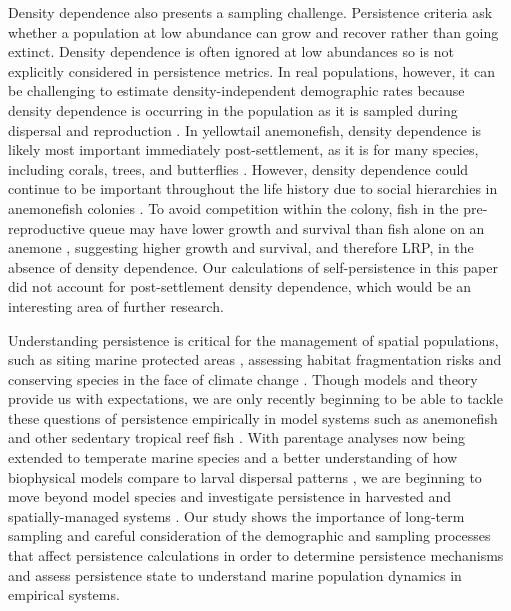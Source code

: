 \documentclass[12pt, oneside]{article}   	%
\begin{document}
Density dependence also presents a sampling challenge. Persistence criteria \citep{hastings_persistence_2006, burgess2014beyond} ask whether a population at low abundance can grow and recover rather than going extinct. Density dependence is often ignored at low abundances \citep{botsford2019population} so is not explicitly considered in persistence metrics. In real populations, however, it can be challenging to estimate density-independent demographic rates because density dependence is occurring in the population as it is sampled during dispersal \citep{nowicki2011evidence} and reproduction \citep{rodenhouse2003multiple}. In yellowtail anemonefish, density dependence is likely most important immediately post-settlement, as it is for many species, including corals, trees, and butterflies \citep{vermeij2008density, harms2000pervasive, nowicki2009relative}. However, density dependence could continue to be important throughout the life history due to social hierarchies in anemonefish colonies \citep{buston2011determinants}. To avoid competition within the colony, fish in the pre-reproductive queue may have lower growth and survival than fish alone on an anemone \citep{buston2003social, buston2003forcible}, suggesting higher growth and survival, and therefore LRP, in the absence of density dependence. Our calculations of self-persistence in this paper did not account for post-settlement density dependence, which would be an interesting area of further research.

Understanding persistence is critical for the management of spatial populations, such as siting marine protected areas \citep{kaplan_model-based_2009}, assessing habitat fragmentation risks \citep{smith2002population, fahrig2001much} and conserving species in the face of climate change \citep{coleman2017anticipating, fuller2015persistence}. Though models and theory provide us with expectations, we are only recently beginning to be able to tackle these questions of persistence empirically in model systems such as anemonefish and other sedentary tropical reef fish \citep{salles_coral_2015,johnson2018integrating}. With parentage analyses now being extended to temperate marine species \citep{baetscher2019dispersal} and a better understanding of how biophysical models compare to larval dispersal patterns \citep{bode2019validation}, we are beginning to move beyond model species and investigate persistence in harvested and spatially-managed systems \citep{garavelli2018population}. Our study shows the importance of long-term sampling and careful consideration of the demographic and sampling processes that affect persistence calculations in order to determine persistence mechanisms and assess persistence state to understand marine population dynamics in empirical systems.
\end{document}
